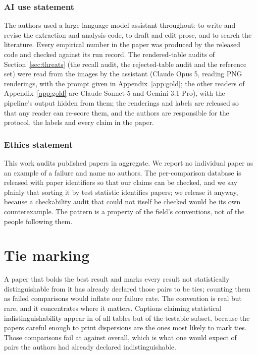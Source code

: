 \documentclass{article}
\begin{document}
\subsubsection*{AI use statement}
The authors used a large language model assistant throughout: to write and
revise the extraction and analysis code, to draft and edit prose, and to search
the literature. Every empirical number in the paper was produced by the
released code and checked against its run record. The rendered-table audits of
Section~\ref{sec:threats} (the recall audit, the rejected-table audit and the
reference set) were read from the images by the assistant (Claude Opus 5,
reading PNG renderings, with the prompt given in Appendix~\ref{app:gold};
the other readers of Appendix~\ref{app:gold} are Claude Sonnet 5 and
Gemini 3.1 Pro), with the pipeline's output hidden from them; the renderings and labels are
released so that any reader can re-score them, and the authors are responsible
for the protocol, the labels and every claim in the paper.

\subsubsection*{Ethics statement}
This work audits published papers in aggregate. We report no individual paper as
an example of a failure and name no authors. The per-comparison database is
released with paper identifiers so that our claims can be checked, and we say
plainly that sorting it by test statistic identifies papers; we release it
anyway, because a checkability audit that could not itself be checked would
be its own counterexample. The pattern is a property of the field's
conventions, not of the people following them.





\appendix

\section{Tie marking}
\label{app:ties}

A paper that bolds the best result and marks every result not statistically
distinguishable from it has already declared those pairs to be ties; counting
them as failed comparisons would inflate our failure rate. The convention is
real but rare, and it concentrates where it matters. Captions claiming
statistical indistinguishability appear in \nPctTieTables{} of all tables but
\nPctTieTestable{} of the testable subset, because the papers careful enough to
print dispersions are the ones most likely to mark ties. Those comparisons fail at \nFailAmongTieMarked{}
against \nPctFail{} overall, which is what one would expect of pairs the authors
had already declared indistinguishable.
\end{document}
